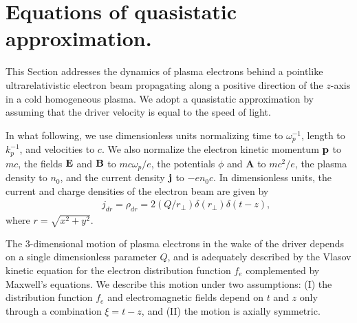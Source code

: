 \documentclass[twocolumn,showpacs,aip]{revtex4}
\begin{document}
\section{Equations of quasistatic approximation.}
This Section addresses  the dynamics of plasma electrons behind a pointlike ultrarelativistic electron beam propagating along a positive direction of the $z$-axis in a cold homogeneous plasma. We adopt a quasistatic approximation by assuming that the driver velocity is equal to the speed of light.

 In what following, we use dimensionless units normalizing time  to $\omega_p^{-1}$, length to $k_p^{-1}$, and velocities to  $c$. We also normalize the electron kinetic momentum ${\bf{p}}$ to $mc$, the fields ${\bf{E}}$ and ${\bf{B}}$ to $mc\omega_p/e$, the potentials $\phi$ and {\bf{A}} to $mc^2/e$, the plasma density to $n_0$, and the current density  ${\bf{j}}$  to $-en_0c$.
 In dimensionless units,  
 the current  and charge densities of the electron  beam   are given by
\begin{eqnarray}
&&j_{dr}=\rho_{dr}=%
2(Q/r_{\perp})\delta(r_{\perp})\delta(t-z),\label{eq:driver}
\end{eqnarray}
where $r=\sqrt{x^2+y^2}$.

The 3-dimensional motion of plasma electrons in the wake of the driver depends on a single dimensionless parameter $Q$, and is adequately described by the  Vlasov kinetic equation for the electron  distribution function $f_e$  complemented by Maxwell's equations. We describe this motion under two assumptions: (I)   the  distribution function $f_e$ and electromagnetic fields depend on $t$ and $z$ only through a combination $\xi=t-z$, and (II) the  motion  is axially  symmetric.
 
\end{document}
